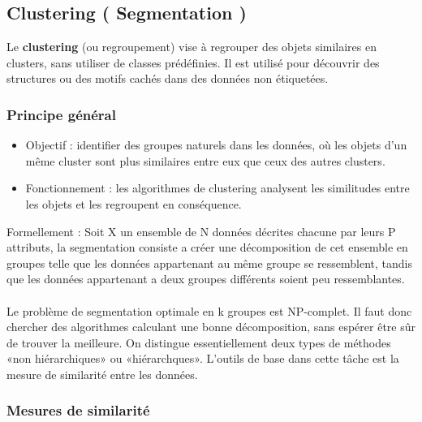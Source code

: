 \documentclass[a4paper,12pt]{report}
\begin{document}

        \subsection{Clustering ( Segmentation )}
        
        Le \textbf{clustering} (ou regroupement) vise à regrouper des objets similaires en clusters, sans utiliser de classes prédéfinies. Il est utilisé pour découvrir des structures ou des motifs cachés dans des données non étiquetées.
        
        \subsubsection*{Principe général}
        
        \begin{itemize}
            \item  Objectif : identifier des groupes naturels dans les données, où les objets d’un même cluster sont plus similaires entre eux que ceux des autres clusters.
            \item  Fonctionnement : les algorithmes de clustering analysent les similitudes entre les objets et les regroupent en conséquence.\\
        \end{itemize}
        Formellement : Soit X un ensemble de N données décrites chacune par leurs P
        attributs, la segmentation consiste a créer une décomposition de cet ensemble
        en groupes telle que les données appartenant au même groupe se ressemblent,
        tandis que les données appartenant a deux groupes différents soient peu
        ressemblantes.{\\}{\\}
        Le problème de segmentation optimale en k groupes est NP-complet. Il faut
        donc chercher des algorithmes calculant une bonne décomposition, sans
        espérer être sûr de trouver la meilleure. On distingue essentiellement deux 
        types de méthodes «non hiérarchiques» ou «hiérarchques».
        L’outils de base dans cette tâche est la mesure de similarité entre les données.
        
        \subsubsection*{Mesures de similarité}
\end{document}
